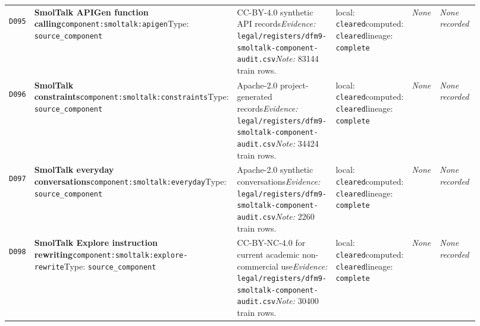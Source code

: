 \documentclass[9pt,a4paper]{article}
\newcommand{\depid}[1]{\hypertarget{dep:#1}{\texttt{#1}}}
\begin{document}
\begin{landscape}
\begin{longtable}{@{}L{0.035\linewidth}L{0.185\linewidth}L{0.27\linewidth}L{0.09\linewidth}L{0.10\linewidth}L{0.24\linewidth}@{}}
\depid{D095} & \textbf{SmolTalk APIGen function calling}\newline \nolinkurl{component:smoltalk:apigen}\newline Type: \texttt{source\_component} & CC-BY-4.0 synthetic API records\newline \textit{Evidence:} \nolinkurl{legal/registers/dfm9-smoltalk-component-audit.csv}\newline \textit{Note:} 83144 train rows. & local: \texttt{cleared}\newline computed: \texttt{cleared}\newline lineage: \texttt{complete} & \textit{None} & \textit{None recorded} \\
\depid{D096} & \textbf{SmolTalk constraints}\newline \nolinkurl{component:smoltalk:constraints}\newline Type: \texttt{source\_component} & Apache-2.0 project-generated records\newline \textit{Evidence:} \nolinkurl{legal/registers/dfm9-smoltalk-component-audit.csv}\newline \textit{Note:} 34424 train rows. & local: \texttt{cleared}\newline computed: \texttt{cleared}\newline lineage: \texttt{complete} & \textit{None} & \textit{None recorded} \\
\depid{D097} & \textbf{SmolTalk everyday conversations}\newline \nolinkurl{component:smoltalk:everyday}\newline Type: \texttt{source\_component} & Apache-2.0 synthetic conversations\newline \textit{Evidence:} \nolinkurl{legal/registers/dfm9-smoltalk-component-audit.csv}\newline \textit{Note:} 2260 train rows. & local: \texttt{cleared}\newline computed: \texttt{cleared}\newline lineage: \texttt{complete} & \textit{None} & \textit{None recorded} \\
\depid{D098} & \textbf{SmolTalk Explore instruction rewriting}\newline \nolinkurl{component:smoltalk:explore-rewrite}\newline Type: \texttt{source\_component} & CC-BY-NC-4.0 for current academic non-commercial use\newline \textit{Evidence:} \nolinkurl{legal/registers/dfm9-smoltalk-component-audit.csv}\newline \textit{Note:} 30400 train rows. & local: \texttt{cleared}\newline computed: \texttt{cleared}\newline lineage: \texttt{complete} & \textit{None} & \textit{None recorded} \\

\end{longtable}
\end{landscape}
\end{document}
